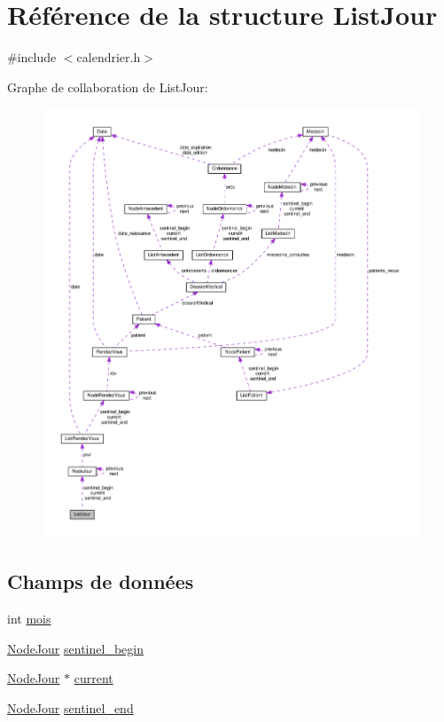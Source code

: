 \hypertarget{struct_list_jour}{\section{Référence de la structure List\-Jour}
\label{struct_list_jour}
}


{\ttfamily \#include $<$calendrier.\-h$>$}



Graphe de collaboration de List\-Jour\-:
\nopagebreak
\begin{figure}[H]
\begin{center}
\leavevmode
\includegraphics[width=350pt]{struct_list_jour__coll__graph}
\end{center}
\end{figure}
\subsection*{Champs de données}
\begin{DoxyCompactItemize}
\item 
int \hyperlink{struct_list_jour_af4d47133f30c1a134b6cecf5cedd7db9}{mois}
\item 
\hyperlink{struct_node_jour}{Node\-Jour} \hyperlink{struct_list_jour_ae0b0389d82fac1c68ddbb3a3cdcbd194}{sentinel\-\_\-begin}
\item 
\hyperlink{struct_node_jour}{Node\-Jour} $\ast$ \hyperlink{struct_list_jour_ac67b6c04656e03ceefbfd375d8f63a9e}{current}
\item 
\hyperlink{struct_node_jour}{Node\-Jour} \hyperlink{struct_list_jour_a0d872681cde96effd5a33a06062ceffd}{sentinel\-\_\-end}
\end{DoxyCompactItemize}



